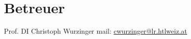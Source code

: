 \section{Betreuer}
Prof. DI Christoph Wurzinger \hspace{5em} mail: \href{mailto:cwurzinger@lr.htlweiz.at}{cwurzinger@lr.htlweiz.at}